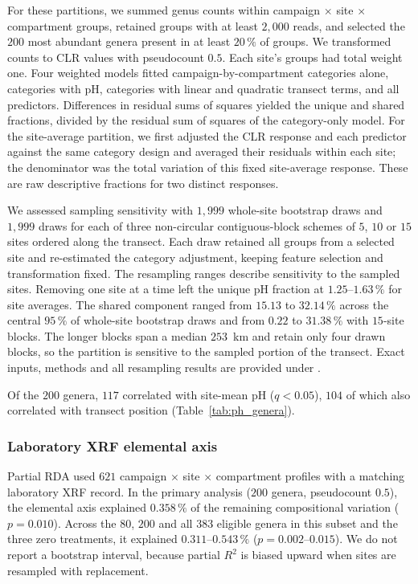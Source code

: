 \documentclass[11pt]{article}
\begin{document}
For these partitions, we summed genus counts within campaign $\times$ site $\times$ compartment groups, retained groups with at least $2{,}000$ reads, and selected the $200$ most abundant genera present in at least $20\,\%$ of groups. We transformed counts to CLR values with pseudocount $0.5$. Each site's groups had total weight one. Four weighted models fitted campaign-by-compartment categories alone, categories with pH, categories with linear and quadratic transect terms, and all predictors. Differences in residual sums of squares yielded the unique and shared fractions, divided by the residual sum of squares of the category-only model. For the site-average partition, we first adjusted the CLR response and each predictor against the same category design and averaged their residuals within each site; the denominator was the total variation of this fixed site-average response. These are raw descriptive fractions for two distinct responses.

We assessed sampling sensitivity with $1{,}999$ whole-site bootstrap draws and $1{,}999$ draws for each of three non-circular contiguous-block schemes of $5$, $10$ or $15$ sites ordered along the transect. Each draw retained all groups from a selected site and re-estimated the category adjustment, keeping feature selection and transformation fixed. The resampling ranges describe sensitivity to the sampled sites. Removing one site at a time left the unique pH fraction at $1.25$--$1.63\,\%$ for site averages. The shared component ranged from $15.13$ to $32.14\,\%$ across the central $95\,\%$ of whole-site bootstrap draws and from $0.22$ to $31.38\,\%$ with $15$-site blocks. The longer blocks span a median $253$~km and retain only four drawn blocks, so the partition is sensitive to the sampled portion of the transect. Exact inputs, methods and all resampling results are provided under .

Of the $200$ genera, $117$ correlated with site-mean pH ($q<0.05$), $104$ of which also correlated with transect position (Table~\ref{tab:ph_genera}).



\subsubsection{Laboratory XRF elemental axis}\label{sup:beta_xrf}
Partial RDA used $621$ campaign $\times$ site $\times$ compartment profiles with a matching laboratory XRF record. In the primary analysis ($200$ genera, pseudocount $0.5$), the elemental axis explained $0.358\,\%$ of the remaining compositional variation ($p=0.010$). Across the $80$, $200$ and all $383$ eligible genera in this subset and the three zero treatments, it explained $0.311$--$0.543\,\%$ ($p=0.002$--$0.015$). We do not report a bootstrap interval, because partial $R^2$ is biased upward when sites are resampled with replacement.
\end{document}

